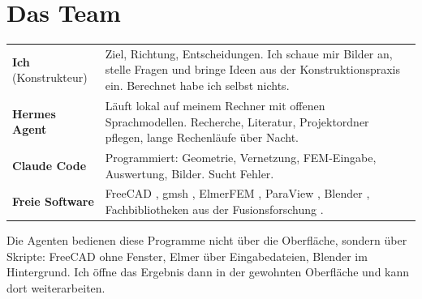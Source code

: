 \documentclass[10pt,a4paper]{article}
\begin{document}
\section{Das Team}
\begin{table}[H]\centering\small
\begin{tabularx}{\linewidth}{@{}lX@{}}\toprule
\textbf{Ich} (Konstrukteur) & Ziel, Richtung, Entscheidungen. Ich schaue mir Bilder an, stelle Fragen und bringe
  Ideen aus der Konstruktionspraxis ein. Berechnet habe ich selbst nichts. \\
\textbf{Hermes Agent} \cite{hermes} & Läuft lokal auf meinem Rechner mit offenen Sprachmodellen. Recherche,
  Literatur, Projektordner pflegen, lange Rechenläufe über Nacht. \\
\textbf{Claude Code} \cite{claudecode} & Programmiert: Geometrie, Vernetzung, FEM-Eingabe, Auswertung, Bilder.
  Sucht Fehler. \\
\textbf{Freie Software} & FreeCAD \cite{freecad}, gmsh \cite{gmsh}, ElmerFEM \cite{elmer}, ParaView
  \cite{paraview}, Blender \cite{blender}, Fachbibliotheken aus der Fusionsforschung \cite{simsopt,desc}. \\\bottomrule
\end{tabularx}\end{table}
Die Agenten bedienen diese Programme nicht über die Oberfläche, sondern über Skripte: FreeCAD ohne Fenster,
Elmer über Eingabedateien, Blender im Hintergrund. Ich öffne das Ergebnis dann in der gewohnten Oberfläche und
kann dort weiterarbeiten.

\end{document}
